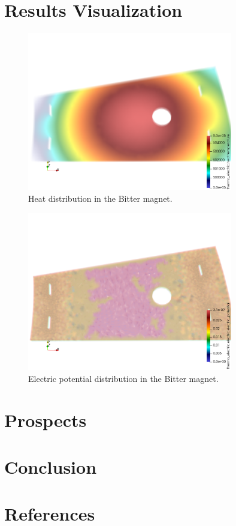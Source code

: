 \documentclass[12pt]{article}
\begin{document}
\section{Results Visualization}
\begin{figure}[H]
	\centering
	\includegraphics[width=0.8\textwidth]{images/heat.png}
	\caption{Heat distribution in the Bitter magnet.}
\end{figure}
\begin{figure}[H]
	\centering
	\includegraphics[width=0.8\textwidth]{images/electric_potential.png}
	\caption{Electric potential distribution in the Bitter magnet.}
\end{figure}
\section{Prospects}

\section{Conclusion}

\newpage

\section{References}
\printbibliography
\end{document}
